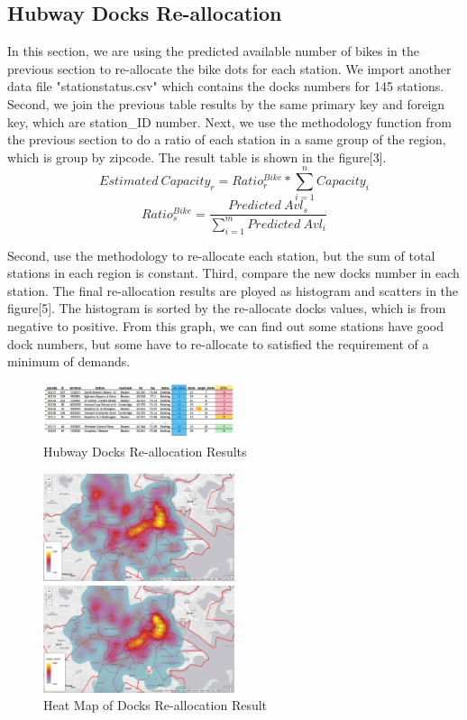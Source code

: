 \documentclass[journal, letterpaper]{IEEEtran}
\begin{document}
\subsection{Hubway Docks Re-allocation}
In this section, we are using the predicted available number of bikes in the previous section to re-allocate the bike dots for each station. We import another data file "stationstatus.csv" which contains the docks numbers for 145 stations. Second, we join the previous table results by the same primary key and foreign key, which are station\_ID number. Next, we use the methodology function from the previous section to do a ratio of each station in a same group of the region, which is group by zipcode. The result table is shown in the figure[3]. 
$$Estimated \ Capacity_{r} = Ratio_{r}^{Bike} * \sum_{i=1}^{n}Capacity_{i}$$
$$Ratio_{s}^{Bike} = \frac{Predicted \ Avl_{s}}{\sum_{i=1}^{m}Predicted \ Avl_{i}}$$

Second, use the methodology to re-allocate each station, but the sum of total stations in each region is constant. Third, compare the new docks number in each station. The final re-allocation results are ployed as histogram and scatters in the figure[5]. The histogram is sorted by the re-allocate docks values, which is from negative to positive. From this graph, we can find out some stations have good dock numbers, but some have to re-allocate to satisfied the requirement of a minimum of demands. 

\begin{figure}
  \includegraphics[width=0.5\textwidth]{resultsheet.jpg}
  \caption{Hubway Docks Re-allocation Results}
  \label{fig:3}
\end{figure}

\begin{figure}
  \includegraphics[width=0.5\textwidth]{docksheat.jpg}
  
  \vspace{0.5cm}
  \includegraphics[width=0.5\textwidth]{assigndocksheat.jpg}
  \caption{Heat Map of Docks Re-allocation Result}
  \captionsetup{justification=centering}
  \label{fig:4}
\end{figure}
\end{document}
